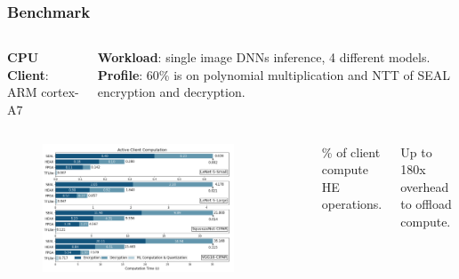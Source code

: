 \documentclass[10pt]{beamer}
\begin{document}
\begin{frame}
\frametitle{Benchmark}
\begin{columns}
    \textbf{CPU Client}: ARM cortex-A7
    \vspace{0.1cm}

    \textbf{Workload}: single image DNNs inference, 4 different models.
\pause
    \textbf{Profile}: 60\% is on polynomial multiplication and NTT of SEAL encryption and decryption.
\end{columns}

\pause
\begin{columns}
\begin{figure}
    \includegraphics[width=0.85\textwidth]{motivation.png}
\end{figure}
    \vspace{-0.5cm}
\% of client compute HE operations.
    \vspace{0.3cm}

Up to 180x overhead to offload compute.
\end{columns}
\centering


\end{frame}


\end{document}
